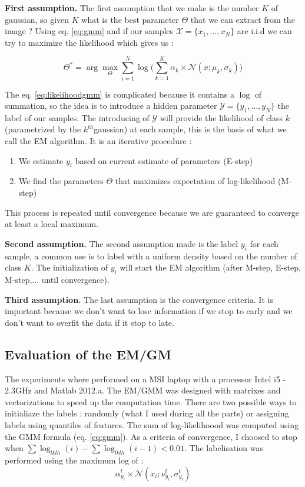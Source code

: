 \documentclass[runningheads,a4paper]{llncs}
\begin{document}
\textbf{First assumption.} The first assumption that we make is the number $K$ of gaussian, so given $K$ what is the best parameter $\Theta$ that we can extract from the image ? 
Using eq. \ref{eq:gmm} and if our samples $\mathcal{X}=\{x_1,...,x_N\}$ are i.i.d we can try to maximize the likelihood which gives us :

\begin{equation}
\Theta^*= \arg\max_{\Theta} \sum^N_{i=1}\log \big(\sum^K_{k=1}\alpha_k\times\mathcal{N}(x;\mu_k,\sigma_k)\big)
\label{eq:likelihoodgmm}
\end{equation}

The eq. \ref{eq:likelihoodgmm} is complicated because it contains a $\log$ of summation, so the idea is to introduce a hidden parameter $\mathcal{Y}=\{y_1,...,y_N\}$ the label of our samples.
The introducing of $\mathcal{Y}$ will provide the likelihood of class $k$ (parametrized by the $k^{th} $gaussian) at each sample, this is the basis of what we call the EM algorithm. 
It is an iterative procedure :
\begin{enumerate}
\item We estimate $y_i$ based on current estimate of parameters (E-step)
\item We find the parameters $\Theta$ that maximizes expectation of log-likelihood (M-step)
\end{enumerate} 
This process is repeated until convergence because we are guaranteed to converge at least a local maximum.\par
\textbf{Second assumption.} The second assumption made is the label $y_i$ for each sample, a common use is to label with a uniform density based on the number of class $K$. The initialization of $y_i$ will start the EM algorithm (after M-step, E-step, M-step,... until convergence).\par
\textbf{Third assumption.} The last assumption is the convergence criteria. It is important because we don't want to lose information if we stop to early and we don't want to overfit the data if it stop to late.

\subsection{Evaluation of the EM/GM}
The experiments where performed on a MSI laptop with a processor Intel i5 - 2.3GHz and Matlab 2012.a.
The EM/GMM was designed with matrixes and vectorizations to speed up the computation time. There are two possible ways to initialiaze the labels : randomly (what I used during all the parts) or assigning labels using quantiles of features. The sum of log-likelihoood was computed using the GMM formula (eq. \ref{eq:gmm}). 
As a criteria of convergence, I choosed to stop when $\sum\log_{lklh}(i) - \sum\log_{lklh} (i-1) < 0.01$. The labelisation was performed using the maximum log of :
\begin{equation}
\alpha_{y_i}^t\times\mathcal{N}(x_i;\nu_{y_i}^t,\sigma_{y_i}^t)
\end{equation}
\end{document}
